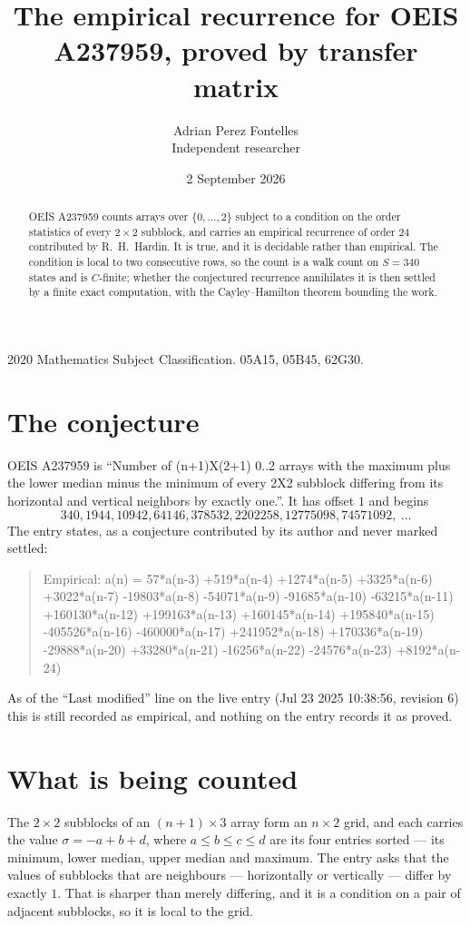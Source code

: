 \documentclass[11pt,a4paper]{article}
\title{The empirical recurrence for OEIS A237959, proved by transfer matrix}
\author{Adrian Perez Fontelles\\ \small Independent researcher}
\date{2 September 2026}
\theoremstyle{plain}
\theoremstyle{definition}
\begin{document}
\maketitle

\begin{abstract}
OEIS A237959 counts arrays over $\{0,\dots,2\}$ subject to a condition on the order
statistics of every $2\times2$ subblock, and carries an empirical recurrence of order
$24$ contributed by R.~H.~Hardin. It is true, and it is decidable rather than empirical.
The condition is local to two consecutive rows, so the count is a walk count on $S=340$
states and is $C$-finite; whether the conjectured recurrence annihilates it is then settled by
a finite exact computation, with the Cayley--Hamilton theorem bounding the work.
\end{abstract}

\noindent\small 2020 Mathematics Subject Classification. 05A15, 05B45, 62G30.\normalsize

\section{The conjecture}

OEIS A237959 is ``Number of (n+1)X(2+1) 0..2 arrays with the maximum plus the lower median minus the minimum of every 2X2 subblock differing from its horizontal and vertical neighbors by exactly one.''. It has offset $1$ and begins
\[
340, 1944, 10942, 64146, 378532, 2202258, 12775098, 74571092,\ \dots
\]
The entry states, as a conjecture contributed by its author and never marked settled:
\begin{quote}
Empirical: a(n) = 57*a(n-3) +519*a(n-4) +1274*a(n-5) +3325*a(n-6) +3022*a(n-7) -19803*a(n-8) -54071*a(n-9) -91685*a(n-10) -63215*a(n-11) +160130*a(n-12) +199163*a(n-13) +160145*a(n-14) +195840*a(n-15) -405526*a(n-16) -460000*a(n-17) +241952*a(n-18) +170336*a(n-19) -29888*a(n-20) +33280*a(n-21) -16256*a(n-22) -24576*a(n-23) +8192*a(n-24)
\end{quote}
As of the ``Last modified'' line on the live entry (Jul 23 2025 10:38:56, revision 6) this is still
recorded as empirical, and nothing on the entry records it as proved.

\section{What is being counted}

The $2\times2$ subblocks of an $(n+1)\times3$ array form an
$n\times2$ grid, and each carries the value $\sigma=-a+b+d$, where $a\le b\le c\le d$ are its four entries sorted --- its minimum, lower median, upper median and maximum. The entry asks that the values of
subblocks that are neighbours --- horizontally or vertically --- differ by exactly $1$.
That is sharper than merely differing, and it is a condition on a pair of adjacent subblocks,
so it is local to the grid.
\end{document}
